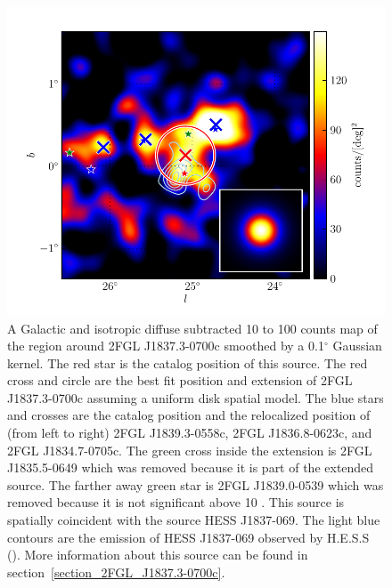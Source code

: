 \documentclass[12pt,preprint]{aastex}
\newcommand{\gev}{\text{GeV}\xspace}
\newcommand{\tev}{\text{TeV}\xspace}
\renewcommand{\deg}{\ensuremath{^\circ}\xspace}
\begin{document}
\begin{figure}
  \begin{center}
    \includegraphics[type=pdf,ext=.pdf,read=.pdf]{source_plots/source_1FGL_J1837.5-0659c}
  \end{center}
  \caption{
  A Galactic and isotropic diffuse subtracted 10 \gev to 100 \gev
  counts map of the region around 2FGL J1837.3-0700c smoothed by a
  0.1\deg Gaussian kernel.  The red star is the catalog position of
  this source. The red cross and circle are the best fit position and
  extension  of 2FGL J1837.3-0700c assuming a uniform disk spatial model.
  The blue stars and crosses are the catalog position and the relocalized
  position of (from left to right) 2FGL J1839.3-0558c, 2FGL J1836.8-0623c,
  and 2FGL J1834.7-0705c.  The green cross inside the extension is 
  2FGL J1835.5-0649 which was removed because it
  is part of the extended source.  The farther away green star is 2FGL
  J1839.0-0539 which was removed because it is not significant above
  10 \gev.  This source is spatially coincident with the \tev source HESS
  J1837-069.  The light blue contours are the \tev emission of HESS J1837-069
  observed by H.E.S.S (\cite{hess_plane_survey}).  More information about
  this source can be found in section~\ref{section_2FGL_J1837.3-0700c}.
  }\label{1FGL_J1837.5-0659c}
\end{figure}
\end{document}
